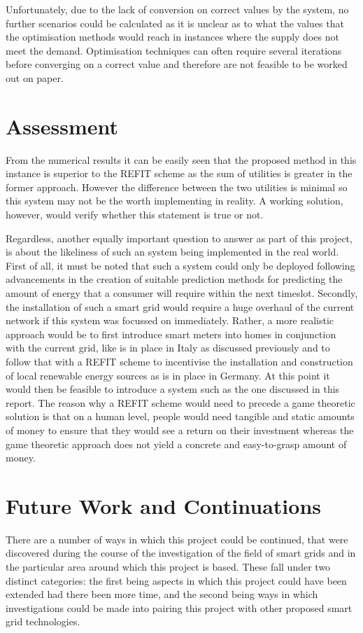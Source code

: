 \documentclass[a4paper, notitlepage]{report}
\begin{document}
Unfortunately, due to the lack of conversion on correct values by the system, no
further scenarios could be calculated as it is unclear as to what the values
that the optimisation methods would reach in instances where the supply does not
meet the demand. Optimisation techniques can often require several iterations
before converging on a correct value and therefore are not feasible to be worked
out on paper.
\chapter{Assessment}
\label{sec:org9facb67}
From the numerical results it can be easily seen that the proposed method in
this instance is superior to the REFIT scheme as the sum of utilities is greater
in the former approach. However the difference between the two utilities is
minimal so this system may not be the worth implementing in reality. A working
solution, however, would verify whether this statement is true or not.

Regardless, another equally important question to answer as part of this
project, is about the likeliness of such an system being implemented in the real
world. First of all, it must be noted that such a system could only be deployed
following advancements in the creation of suitable prediction methods for
predicting the amount of energy that a consumer will require within the next
timeslot. Secondly, the installation of such a smart grid would require a huge
overhaul of the current network if this system was focussed on immediately.
Rather, a more realistic approach would be to first introduce smart meters into
homes in conjunction with the current grid, like is in place in Italy as
discussed previously and to follow that with a REFIT scheme to incentivise the
installation and construction of local renewable energy sources as is in place
in Germany. At this point it would then be feasible to introduce a system such
as the one discussed in this report. The reason why a REFIT scheme would need to
precede a game theoretic solution is that on a human level, people would need
tangible and static amounts of money to ensure that they would see a return on
their investment whereas the game theoretic approach does not yield a concrete
and easy-to-grasp amount of money.
\chapter{Future Work and Continuations}
\label{sec:orgcad3576}
There are a number of ways in which this project could be continued, that were
discovered during the course of the investigation of the field of smart grids
and in the particular area around which this project is based. These fall under
two distinct categories: the first being aspects in which this project could
have been extended had there been more time, and the second being ways in which
investigations could be made into pairing this project with other proposed smart
grid technologies.
\end{document}

